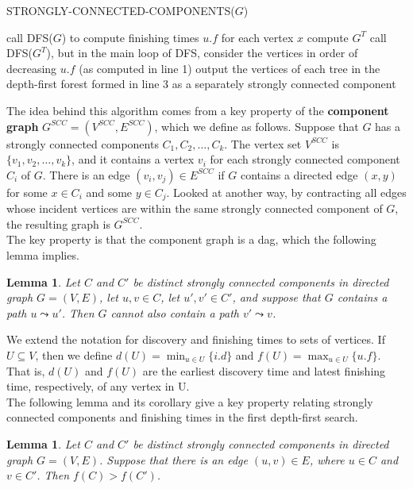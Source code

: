 \documentclass[12pt]{article}
\newtheorem{lemma}[theorem]{Lemma}
\begin{document}
STRONGLY-CONNECTED-COMPONENTS($G$)
\begin{algorithmic} [1]
\State call DFS($G$) to compute finishing times $u.f$ for each vertex $x$
\State compute $G^T$
\State call DFS($G^T$), but in the main loop of DFS, consider the vertices in order of decreasing $u.f$ (as computed in line 1)
\State output the vertices of each tree in the depth-first forest formed in line 3 as a separately strongly connected component
\end{algorithmic}

The idea behind this algorithm comes from a key property of the \textbf{component graph} $G^{SCC} = (V^{SCC}, E^{SCC})$, which we define as follows. Suppose that $G$ has a strongly connected components $C_1, C_2, \dots, C_k$. The vertex set $V^{SCC}$ is $\{ v_1, v_2, \dots, v_k \}$, and it contains a vertex $v_i$ for each strongly connected component $C_i$ of $G$. There is an edge $(v_i, v_j) \in E^{SCC}$ if $G$ contains a directed edge $(x, y)$ for some $x \in C_i$ and some $y \in C_j$. Looked at another way, by contracting all edges whose incident vertices are within the same strongly connected component of $G$, the resulting graph is $G^{SCC}$. \\

The key property is that the component graph is a dag, which the following lemma implies.

\begin{lemma}
  Let $C$ and $C'$ be distinct strongly connected components in directed graph $G = (V,E)$, let $u,v \in C$, let $u', v' \in C'$, and suppose that $G$ contains a path $u \leadsto u'$. Then $G$ cannot also contain a path $v' \leadsto v$.
\end{lemma}

We extend the notation for discovery and finishing times to sets of vertices. If $U \subseteq V$, then we define $d(U) = \min_{u \in U} \{ i.d \}$ and $f(U) = \max_{u \in U} \{ u.f \}$. That is, $d(U)$ and $f(U)$ are the earliest discovery time and latest finishing time, respectively, of any vertex in U. \\

The following lemma and its corollary give a key property relating strongly connected components and finishing times in the first depth-first search.

\begin{lemma}
  Let $C$ and $C'$ be distinct strongly connected components in directed graph $G = (V,E)$. Suppose that there is an edge $(u,v) \in E$, where $u \in C$ and $v \in C'$. Then $f(C) > f(C')$. 
\end{lemma}
\end{document}
